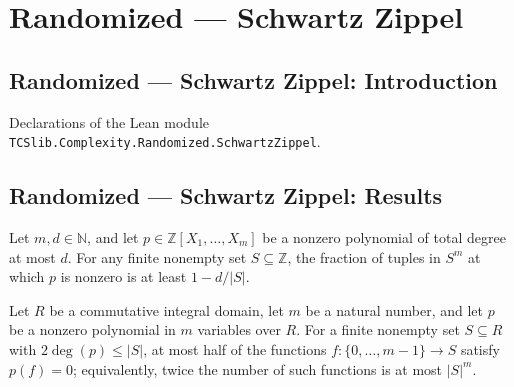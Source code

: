 \section{Randomized --- Schwartz Zippel}
\subsection*{Randomized --- Schwartz Zippel: Introduction}

Declarations of the Lean module \texttt{TCSlib.Complexity.Randomized.SchwartzZippel}.

\subsection*{Randomized --- Schwartz Zippel: Results}

\begin{theorem}
\label{Randomized.schwartz_zippel}
\leanok
{}
Let $m,d\in\mathbb{N}$, and let $p\in\mathbb{Z}[X_1,\ldots,X_m]$ be a nonzero polynomial
of total degree at most $d$. For any finite nonempty set $S\subseteq\mathbb{Z}$, the
fraction of tuples in $S^m$ at which $p$ is nonzero is at least $1-d/|S|$.
\end{theorem}

\begin{theorem}
\label{Randomized.two_mul_card_eval_eq_zero_le}
\leanok
{}
Let $R$ be a commutative integral domain, let $m$ be a natural number, and let $p$ be a
nonzero polynomial in $m$ variables over $R$. For a finite nonempty set $S\subseteq R$
with $2\deg(p)\le |S|$, at most half of the functions $f:\{0,\ldots,m-1\}\to S$ satisfy
$p(f)=0$; equivalently, twice the number of such functions is at most $|S|^m$.
\end{theorem}
